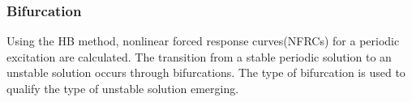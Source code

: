 \subsubsection{Bifurcation}
\label{sec:bifurcation}


Using the HB method, nonlinear forced response curves(NFRCs) for a periodic
excitation are calculated. The transition from a stable periodic solution to an
unstable solution occurs through bifurcations. The type of bifurcation is used
to qualify the type of unstable solution emerging.













